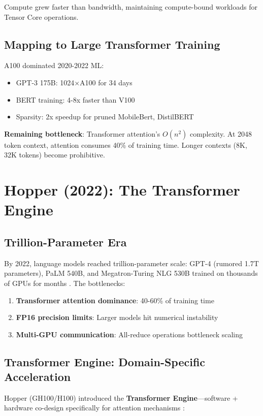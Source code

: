\documentclass{article}
\begin{document}
Compute grew faster than bandwidth, maintaining compute-bound workloads for Tensor Core operations.

\subsection{Mapping to Large Transformer Training}

A100 dominated 2020-2022 ML:
\begin{itemize}
\item GPT-3 175B: 1024×A100 for 34 days
\item BERT training: 4-8x faster than V100
\item Sparsity: 2x speedup for pruned MobileBert, DistilBERT
\end{itemize}

\textbf{Remaining bottleneck}: Transformer attention's $O(n^2)$ complexity. At 2048 token context, attention consumes 40\% of training time. Longer contexts (8K, 32K tokens) become prohibitive.

\section{Hopper (2022): The Transformer Engine}

\subsection{Trillion-Parameter Era}

By 2022, language models reached trillion-parameter scale: GPT-4 (rumored 1.7T parameters), PaLM 540B, and Megatron-Turing NLG 530B trained on thousands of GPUs for months \cite{chowdhery2022palm}. The bottlenecks:

\begin{enumerate}
\item \textbf{Transformer attention dominance}: 40-60\% of training time
\item \textbf{FP16 precision limits}: Larger models hit numerical instability
\item \textbf{Multi-GPU communication}: All-reduce operations bottleneck scaling
\end{enumerate}

\subsection{Transformer Engine: Domain-Specific Acceleration}

Hopper (GH100/H100) introduced the \textbf{Transformer Engine}—software + hardware co-design specifically for attention mechanisms \cite{nvidia2022hopper}:
\end{document}
